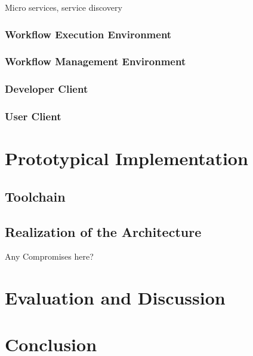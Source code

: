 \documentclass[language=english,noinputenc]{wiwwuwordrprt}
\begin{document}
        Micro services, service discovery \cite{Stubbs2015Distributed}

      \subsection{Workflow Execution Environment} %
      \label{sub:workflow_execution_environment}

      \subsection{Workflow Management Environment} %
      \label{sub:workflow_management}

      \subsection{Developer Client} %
      \label{sub:developer_client}


      \subsection{User Client} %
      \label{sub:user_client}




  \chapter{Prototypical Implementation} %
  \label{cha:implementation}

    \section{Toolchain} %
    \label{sec:toolchain}


    \section{Realization of the Architecture} %
    \label{sec:realization_of_the_architecture}
    Any Compromises here?


  \chapter{Evaluation and Discussion} %
  \label{cha:evaluation}


  \chapter{Conclusion} %
  \label{cha:conclusion}


  
  
\end{document}
